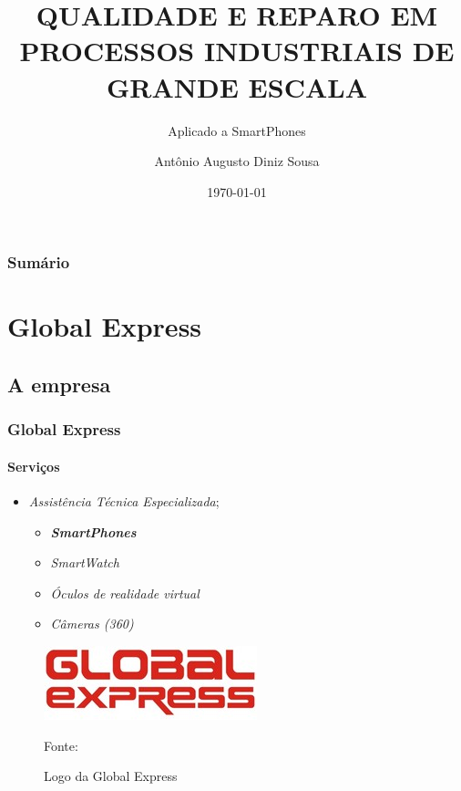 \documentclass[aspectratio=169]{beamer}
\begin{document}
	\title[3º Relatório de Acompanhamento do Estagiário]{QUALIDADE E REPARO EM PROCESSOS INDUSTRIAIS DE GRANDE ESCALA}
	\subtitle{Aplicado a SmartPhones}
	\author[antonioaads@gmail.com]{Antônio Augusto Diniz Sousa}
	\date[2017]{\today}
	
	\begin{frame}
		\titlepage
	\end{frame}
	\begin{frame}
		\frametitle{Sum\'{a}rio}
		\tableofcontents%
	\end{frame}
	
	\section{Global Express}
	\subsection{A empresa}
	
	\begin{frame}
		\frametitle{Global Express}
		\framesubtitle{Serviços}
		
		\begin{minipage}[!h]{.4\textwidth}
			\begin{itemize}
				\item \textit{Assistência Técnica Especializada};
				\begin{itemize}
					\item \textit{\textbf{SmartPhones}}
					\item \textit{SmartWatch}
					\item \textit{Óculos de realidade virtual}
					\item \textit{Câmeras (360)}
				\end{itemize}
			\end{itemize}
		\end{minipage}
		\hfill
		\begin{minipage}[!h]{.5\textwidth}
			\begin{figure}
				\centering
				\caption{Logo da Global Express}
				
				\includegraphics[width=.70\linewidth]{logo_global.png}
				
				\footnotesize{Fonte: \citeonline{global}}
				\label{logglob}
			\end{figure} 	 
		\end{minipage}
	\end{frame}
	
\end{document}
